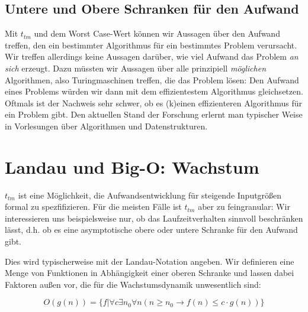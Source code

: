 \subsection{Untere und Obere Schranken für den Aufwand}
Mit $t_{tm}$ und dem Worst Case-Wert können wir Aussagen über den Aufwand treffen,
den ein bestimmter Algorithmus für ein bestimmtes Problem verursacht.
Wir treffen allerdings keine Aussagen darüber,
wie viel Aufwand das Problem \emph{an sich} erzeugt.
Dazu müssten wir Aussagen über alle prinzipiell \emph{möglichen} Algorithmen,
also Turingmaschinen treffen,
die das Problem lösen:
Den Aufwand eines Problems würden wir dann mit dem effizientestem Algorithmus gleichsetzen.
Oftmals ist der Nachweis sehr schwer,
ob es (k)einen effizienteren Algorithmus
für ein Problem gibt.
Den aktuellen Stand der Forschung erlernt man typischer Weise in Vorlesungen über
Algorithmen und Datenstrukturen.


\section{Landau und Big-O: Wachstum}

$t_{tm}$ ist eine Möglichkeit,
die Aufwandsentwicklung für steigende Inputgrößen formal zu spezfifizieren.
Für die meisten Fälle ist $t_{tm}$ aber zu feingranular:
Wir interessieren uns beispielsweise nur,
ob das Laufzeitverhalten sinnvoll beschränken lässt,
d.h. ob es eine asymptotische obere oder untere Schranke für den Aufwand gibt.

Dies wird typischerweise mit der Landau-Notation angeben.
Wir definieren eine Menge von Funktionen in Abhängigkeit einer oberen Schranke
und lassen dabei Faktoren außen vor,
die für die Wachstumsdynamik unwesentlich sind:

\[
O(g(n)) = \{f|\forall c \exists n_0 \forall n (n \geq n_0 \rightarrow f(n) \leq c \cdot g(n))\}
\]

